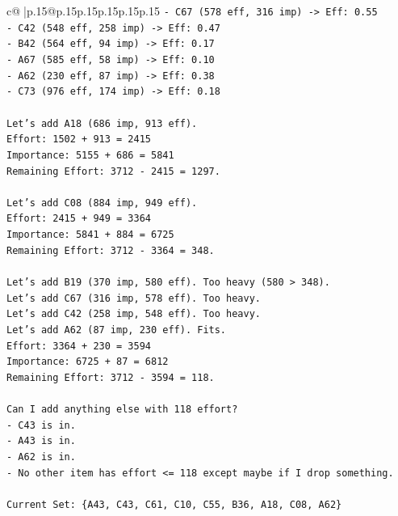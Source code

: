 \documentclass{article}
\begin{document}
{\begin{supertabular}{c@{$\;$}|p{.15\linewidth}@{}p{.15\linewidth}p{.15\linewidth}p{.15\linewidth}p{.15\linewidth}p{.15\linewidth}}
{{{\texttt{{-} C67 (578 eff, 316 imp) {-}> Eff: 0.55} \\
\texttt{{-} C42 (548 eff, 258 imp) {-}> Eff: 0.47} \\
\texttt{{-} B42 (564 eff, 94 imp) {-}> Eff: 0.17} \\
\texttt{{-} A67 (585 eff, 58 imp) {-}> Eff: 0.10} \\
\texttt{{-} A62 (230 eff, 87 imp) {-}> Eff: 0.38} \\
\texttt{{-} C73 (976 eff, 174 imp) {-}> Eff: 0.18} \\
\\ 
\texttt{Let's add A18 (686 imp, 913 eff).} \\
\texttt{Effort: 1502 + 913 = 2415} \\
\texttt{Importance: 5155 + 686 = 5841} \\
\texttt{Remaining Effort: 3712 {-} 2415 = 1297.} \\
\\ 
\texttt{Let's add C08 (884 imp, 949 eff).} \\
\texttt{Effort: 2415 + 949 = 3364} \\
\texttt{Importance: 5841 + 884 = 6725} \\
\texttt{Remaining Effort: 3712 {-} 3364 = 348.} \\
\\ 
\texttt{Let's add B19 (370 imp, 580 eff). Too heavy (580 > 348).} \\
\texttt{Let's add C67 (316 imp, 578 eff). Too heavy.} \\
\texttt{Let's add C42 (258 imp, 548 eff). Too heavy.} \\
\texttt{Let's add A62 (87 imp, 230 eff). Fits.} \\
\texttt{Effort: 3364 + 230 = 3594} \\
\texttt{Importance: 6725 + 87 = 6812} \\
\texttt{Remaining Effort: 3712 {-} 3594 = 118.} \\
\\ 
\texttt{Can I add anything else with 118 effort?} \\
\texttt{{-} C43 is in.} \\
\texttt{{-} A43 is in.} \\
\texttt{{-} A62 is in.} \\
\texttt{{-} No other item has effort <= 118 except maybe if I drop something.} \\
\\ 
\texttt{Current Set: \{A43, C43, C61, C10, C55, B36, A18, C08, A62\}} \\
}}}
\end{supertabular}}
\end{document}
